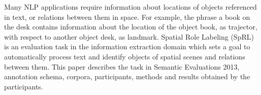 Many NLP applications require information about locations of objects referenced in text,
 or relations between them in space. For example,
 the phrase a book on the desk contains
 information about the location of the object
 book, as trajector, with respect to another object
 desk, as landmark. Spatial Role Labeling
 (SpRL) is an evaluation task in the information
 extraction domain which sets a goal
 to automatically process text and identify objects
 of spatial scenes and relations between
 them. This paper describes the task in Semantic
 Evaluations 2013, annotation schema,
 corpora, participants, methods and results obtained
 by the participants.

